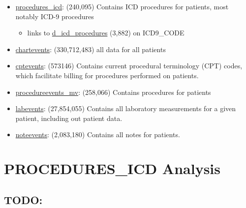 \documentclass[11pt]{article}
\providecommand{\tightlist}{%
      \setlength{\itemsep}{0pt}\setlength{\parskip}{0pt}}
\begin{document}
\begin{itemize}
\tightlist
\item
  \href{https://mimic.physionet.org/mimictables/procedures_icd/}{procedures\_icd}:
  (240,095) Contains ICD procedures for patients, most notably ICD-9
  procedures

  \begin{itemize}
  \tightlist
  \item
    links to
    \href{https://mimic.physionet.org/mimictables/d_icd_procedures/}{d\_icd\_procedures}
    (3,882) on ICD9\_CODE
  \end{itemize}
\item
  \href{https://mimic.physionet.org/mimictables/chartevents/}{chartevents}:
  (330,712,483) all data for all patients
\item
  \href{https://mimic.physionet.org/mimictables/cptevents/}{cptevents}:
  (573146) Contains current procedural terminology (CPT) codes, which
  facilitate billing for procedures performed on patients.
\item
  \href{https://mimic.physionet.org/mimictables/procedureevents_mv/}{procedureevents\_mv}:
  (258,066) Contains procedures for patients
\item
  \href{https://mimic.physionet.org/mimictables/labevents/}{labevents}:
  (27,854,055) Contains all laboratory measurements for a given patient,
  including out patient data.
\item
  \href{https://mimic.physionet.org/mimictables/noteevents/}{noteevents}:
  (2,083,180) Contains all notes for patients.
\end{itemize}

    \section{PROCEDURES\_ICD Analysis}\label{procedures_icd-analysis}

\subsection{TODO:}\label{todo}
\end{document}
